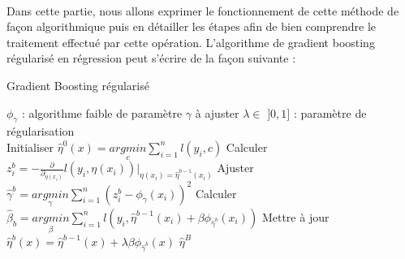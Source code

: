 \documentclass[14pt, openany]{article}
\begin{document}
\paragraph{}
Dans cette partie, nous allons exprimer le fonctionnement de cette méthode de façon algorithmique puis en détailler les étapes afin de bien comprendre le traitement effectué par cette opération. L'algorithme de gradient boosting régularisé en régression peut s'écrire de la façon suivante :\\
\begin{algorithm}
\caption{Gradient Boosting régularisé}
\begin{algorithmic}
\REQUIRE 
\STATE $\phi_{\gamma}$ : algorithme faible de paramètre $\gamma$ à ajuster
\STATE $\lambda \in $ $]0,1]$ : paramètre de régularisation\\
\ENSURE
\STATE Initialiser $\hat{\eta}^0(x)=\underset{c}{argmin}\sum\limits_{i=1}^n l(y_i,c)$
\STATE Calculer $z_{i}^b=-\frac{\partial}{\partial_{\eta(x_i)}}l(y_i,\eta(x_i))\vert_{\eta(x_i)=\hat{\eta}^{b-1}(x_i)}$
\STATE Ajuster $\hat{\gamma}^b=\underset{\gamma}{argmin}\sum\limits_{i=1}^n(z_{i}^b-\phi_{\gamma}(x_i))^2$
\STATE Calculer $\hat{\beta}_b=\underset{\beta}{argmin}\sum\limits_{i=1}^n l(y_i,\hat{\eta}^{b-1}(x_i)+\beta\phi_{\hat{\gamma}^b}(x_i))$
\STATE Mettre à jour $\hat{\eta}^b(x)=\hat{\eta}^{b-1}(x)+\lambda\beta\phi_{\hat{\gamma}^b}(x)$
\ENDFOR
\RETURN $\hat{\eta}^B$
\PRINT
\end{algorithmic}
\end{algorithm}
\end{document}
